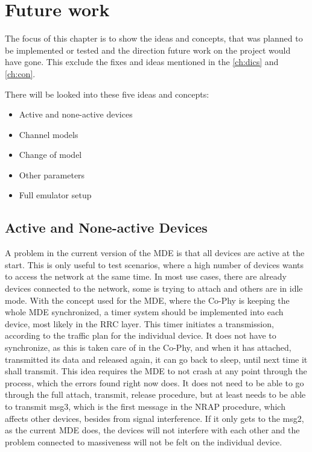 \section{Future work}
\label{ch:Future}
The focus of this chapter is to show the ideas and concepts, that was planned to be implemented or tested and the direction future work on the project would have gone. This exclude the fixes and ideas mentioned in the \autoref{ch:dics} and \autoref{ch:con}.

There will be looked into these five ideas and concepts:

\begin{itemize}
\item Active and none-active devices
\item Channel models
\item Change of model
\item Other parameters
\item Full emulator setup
\end{itemize}

\subsection{Active and None-active Devices}
A problem in the current version of the MDE is that all devices are active at the start. This is only useful to test scenarios, where a high number of devices wants to access the network at the same time. In most use cases, there are already devices connected to the network, some is trying to attach and others are in idle mode. With the concept used for the MDE, where the Co-Phy is keeping the whole MDE synchronized, a timer system should be implemented into each device, most likely in the RRC layer. This timer initiates a transmission, according to the traffic plan for the individual device. It does not have to synchronize, as this is taken care of in the Co-Phy, and when it has attached, transmitted its data and released again, it can go back to sleep, until next time it shall transmit. This idea requires the MDE to not crash at any point through the process, which the errors found right now does. It does not need to be able to go through the full attach, transmit, release procedure, but at least needs to be able to transmit msg3, which is the first message in the NRAP procedure, which affects other devices, besides from signal interference. If it only gets to the msg2, as the current MDE does, the devices will not interfere with each other and the problem connected to massiveness will not be felt on the individual device.

